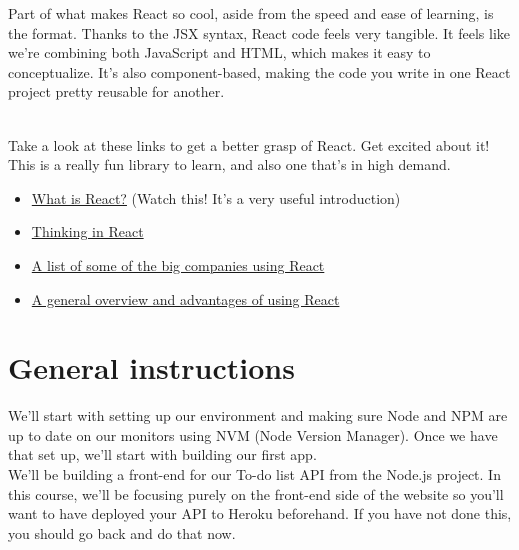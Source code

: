 \documentclass{42-en}
\begin{document}
Part of what makes React so cool, aside from the speed and ease of learning, is the format. Thanks to the JSX syntax, React code feels very tangible. It feels like we're combining both JavaScript and HTML, which makes it easy to conceptualize. It's also component-based, making the code you write in one React project pretty reusable for another.

~\\
Take a look at these links to get a better grasp of React. Get excited about it! This is a really fun library to learn, and also one that's in high demand.
\begin{itemize}\itemsep1pt
    \item \href{https://youtu.be/N3AkSS5hXMA}{What is React?} (Watch this! It's a very useful introduction)
    \item \href{https://reactjs.org/docs/thinking-in-react.html}{Thinking in React}
    \item \href{https://brainhub.eu/blog/10-famous-apps-using-reactjs-nowadays/}{A list of some of the big companies using React}
    \item \href{https://medium.com/@hamzamahmood/advantages-of-developing-modern-web-apps-with-react-js-8504c571db71}{A general overview and advantages of using React}
\end{itemize}

\chapter{General instructions}

We'll start with setting up our environment and making sure Node and NPM are up to date on our monitors using NVM (Node Version Manager). Once we have that set up, we'll start with building our first app. \\

We'll be building a front-end for our To-do list API from the Node.js project. In this course, we'll be focusing purely on the front-end side of the website so you'll want to have deployed your API to Heroku beforehand. If you have not done this, you should go back and do that now. \\
\end{document}
